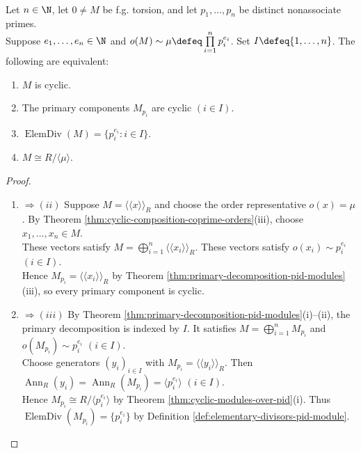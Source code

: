 \begin{theorem} \label{thm:cyclic-torsion-module-characterization} \\
Let $n\in\N$, let $0\neq M$ be f.g. torsion, and let $p_1,\ldots,p_n$ be distinct nonassociate primes.\\
Suppose $e_1,\ldots,e_n\in\N$ and $o(M)\sim\mu\defeq\prod\limits_{i=1}^np_i^{e_i}$. Set $I\defeq\{1,\ldots,n\}$. The following are equivalent:
\begin{enumerate}[label=(\roman*)]
\setlength{\itemsep}{0pt}
\item $M$ is cyclic.
\item The primary components $M_{p_i}$ are cyclic $(i\in I)$.
\item $\operatorname{ElemDiv}(M)=\{p_i^{e_i}:i\in I\}$.
\item $M\cong R/\langle\mu\rangle$.
\end{enumerate}
\begin{proof}
\begin{enumerate}[label=(\roman*)]
\setlength{\itemsep}{0pt}
\item[$(i)$]$\Rightarrow (ii)$ Suppose $M=\langle\!\langle x\rangle\!\rangle_R$ and choose the order representative $o(x)=\mu$. By Theorem \ref{thm:cyclic-composition-coprime-orders}(iii), choose $x_1,\ldots,x_n\in M$.\\
These vectors satisfy $M=\bigoplus\limits_{i=1}^n\langle\!\langle x_i\rangle\!\rangle_R$. These vectors satisfy $o(x_i)\sim p_i^{e_i}$ $(i\in I)$.\\
Hence $M_{p_i}=\langle\!\langle x_i\rangle\!\rangle_R$ by Theorem \ref{thm:primary-decomposition-pid-modules}(iii), so every primary component is cyclic.\\
\item[$(ii)$]$\Rightarrow (iii)$ By Theorem \ref{thm:primary-decomposition-pid-modules}(i)--(ii), the primary decomposition is indexed by $I$. It satisfies $M=\bigoplus\limits_{i=1}^nM_{p_i}$ and $o(M_{p_i})\sim p_i^{e_i}$ $(i\in I)$.\\
Choose generators $(y_i)_{i\in I}$ with $M_{p_i}=\langle\!\langle y_i\rangle\!\rangle_R$. Then $\operatorname{Ann}_R(y_i)=\operatorname{Ann}_R(M_{p_i})=\langle p_i^{e_i}\rangle$ $(i\in I)$.\\
Hence $M_{p_i}\cong R/\langle p_i^{e_i}\rangle$ by Theorem \ref{thm:cyclic-modules-over-pid}(i). Thus $\operatorname{ElemDiv}(M_{p_i})=\{p_i^{e_i}\}$ by Definition \ref{def:elementary-divisors-pid-module}.\\

\end{enumerate}
\end{proof}
\end{theorem}
